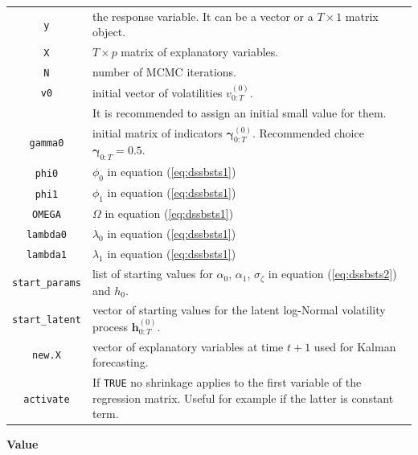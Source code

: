 \documentclass[
  12pt,
]{book}
\theoremstyle{break}
\theoremstyle{nonumberplain}
\begin{document}
\begin{small}
\begin{longtable}{ c l }
\texttt{y} &  the response variable. It can be a vector or a $T\times1$ matrix object. \\
\texttt{X} &  $T \times p$ matrix of explanatory variables.\\
\texttt{N} &  number of MCMC iterations. \\
\texttt{v0} &  initial vector of volatilities $v^{(0)}_{0:T}$. \\
 & It is recommended to assign an initial small value for them. \\
\texttt{gamma0} &  initial matrix of indicators $\boldsymbol{\gamma}^{(0)}_{0:T}$. Recommended choice $\boldsymbol{\gamma}_{0:T}=0.5$.  \\  
\texttt{phi0} & $\phi_{0}$ in equation (\ref{eq:dssbsts1})\\
\texttt{phi1} &  $\phi_1$ in equation (\ref{eq:dssbsts1})\\
\texttt{OMEGA} &  $\Omega$ in equation (\ref{eq:dssbsts1})\\
\texttt{lambda0} &  $\lambda_0$ in equation (\ref{eq:dssbsts1})\\
\texttt{lambda1} &  $\lambda_1$ in equation (\ref{eq:dssbsts1})\\
\texttt{start\_params} &  list of starting values for $\alpha_0$, $\alpha_1$, $\sigma_\zeta$ in equation (\ref{eq:dssbsts2}) and $h_0$.\\
\texttt{start\_latent} &  vector of starting values for the latent log-Normal volatility process $\boldsymbol{h}^{(0)}_{0:T}$.\\
\texttt{new.X} &  vector of explanatory variables at time $t+1$ used for Kalman forecasting.\\
\texttt{activate} & If \texttt{TRUE} no shrinkage applies to the first variable of the regression matrix. Useful for example if the latter is constant term.
\end{longtable}
\end{small}

\textbf{Value}
\end{document}
